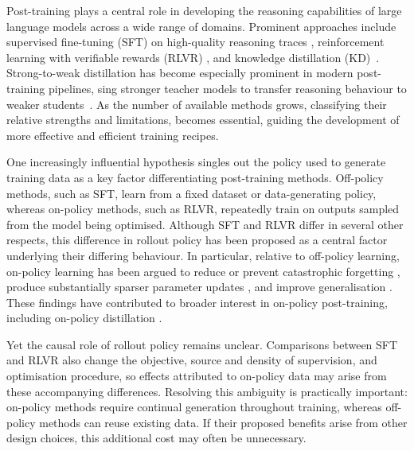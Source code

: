 \documentclass{article} %
\theoremstyle{plain}
\theoremstyle{definition}
\theoremstyle{remark}
\begin{document}
Post-training plays a central role in developing the reasoning capabilities of large language models across a wide range of domains. Prominent approaches include supervised fine-tuning (SFT) on high-quality reasoning traces \citep{guha_openthoughts_2025, team_kimi_2026}, reinforcement learning with verifiable rewards (RLVR) \citep{deepseek-ai_deepseek-r1_2025, shao_deepseekmath_2024, yu_dapo_2025}, and knowledge distillation (KD)~\citep{hinton_distilling_2015, agarwal_-policy_2024, team_mimo-v2-flash_2026}. 
Strong-to-weak distillation has become especially prominent in modern post-training pipelines, sing stronger teacher models to transfer reasoning behaviour to weaker students~\citep{team2025qwen3, deepseekai2026deepseekv4highlyefficientmilliontoken}. As the number of available methods grows, classifying their relative strengths and limitations, becomes essential, guiding the development of more effective and efficient training recipes.

One increasingly influential hypothesis singles out the policy used to generate training data as a key factor differentiating post-training methods. Off-policy methods, such as SFT, learn from a fixed dataset or data-generating policy, whereas on-policy methods, such as RLVR, repeatedly train on outputs sampled from the model being optimised. Although SFT and RLVR differ in several other respects, this difference in rollout policy has been proposed as a central factor underlying their differing behaviour.
In particular, relative to off-policy learning, on-policy learning has been argued to reduce or prevent catastrophic forgetting \citep{shenfeld_rls_2025, chen_retaining_2025, shenfeld_self-distillation_2026}, produce substantially sparser parameter updates \citep{mukherjee_reinforcement_2025}, and improve generalisation \citep{chu_sft_2025, zhang_towards_2026, yuan2026f, ming_one-token_2026}. These findings have contributed to broader interest in on-policy post-training, including on-policy distillation \citep{song2026surveyonpolicydistillationlarge, agarwal_-policy_2024, lu2025onpolicydistillation, team_mimo-v2-flash_2026}. 

Yet the causal role of rollout policy remains unclear. Comparisons between SFT and RLVR also change the objective, source and density of supervision, and optimisation procedure, so effects attributed to on-policy data may arise from these accompanying differences. Resolving this ambiguity is practically important: on-policy methods require continual generation throughout training, whereas off-policy methods can reuse existing data. If their proposed benefits arise from other design choices, this additional cost may often be unnecessary.
\end{document}
